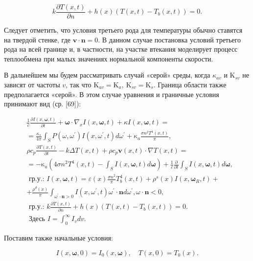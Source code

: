 \documentclass[10pt]{article}
\begin{document}
$$
k \frac{\partial T(x, t)}{\partial n}+h(x)\left(T(x, t)-T_{b}(x, t)\right)=0 .
$$

Следует отметить, что условия третьего рода для температуры обычно ставятся на твердой стенке, где $\mathbf{v} \cdot \mathbf{n}=0$. В данном случае постановка условий третьего рода на всей границе и, в частности, на участке втекания моделирует процесс теплообмена при малых значениях нормальной компоненты скорости.

В дальнейшем мы будем рассматривать случай «серой» среды, когда $\kappa_{a v}$ и $\mathrm{K}_{s v}$ не зависят от частоты $v$, так что $\mathrm{K}_{a v}=\mathrm{K}_{a}, \mathrm{~K}_{s v}=\mathrm{K}_{s}$. Граница области также предполагается «серой». В этом случае уравнения и граничные условия принимают вид (ср. [69]):

$$
\begin{aligned}
& \frac{1}{c} \frac{\partial I(x, \boldsymbol{\omega}, t)}{\partial t}+\boldsymbol{\omega} \cdot \nabla_{x} I(x, \boldsymbol{\omega}, t)+\kappa I(x, \boldsymbol{\omega}, t)= \\
& =\frac{\kappa_{s}}{4 \pi} \int_{S} P\left(\omega, \omega^{\prime}\right) I\left(x, \omega^{\prime}, t\right) d \omega^{\prime}+\kappa_{a} \frac{\sigma n^{2} T^{4}(x, t)}{\pi}, \\
& \rho c_{p} \frac{\partial T(x, t)}{\partial t}-k \Delta T(x, t)+\rho c_{p} \mathbf{v}(x, t) \cdot \nabla T(x, t)= \\
& =-\mathrm{\kappa}_{a}\left(4 \sigma n^{2} T^{4}(x, t)-\int_{S} I(x, \boldsymbol{\omega}, t) d \boldsymbol{\omega}\right)+\frac{1}{c} \frac{\partial}{\partial t} \int_{S} I(x, \boldsymbol{\omega}, t) d \boldsymbol{\omega}, \\
& \text { гр.у.: } I(x, \boldsymbol{\omega}, t)=\varepsilon(x) \frac{\sigma n^{2}}{\pi} T_{b}^{4}(x, t)+\rho^{s}(x) I\left(x, \boldsymbol{\omega}_{R}, t\right)+ \\
& +\frac{\rho^{d}(x)}{\pi} \int_{\omega^{\prime} \cdot \mathbf{n}>0} I\left(x, \omega^{\prime}, t\right) \omega^{\prime} \cdot \mathbf{n} d \omega^{\prime}, \omega \cdot \mathbf{n}<0, \\
& \text { гр.у.: } k \frac{\partial T(x, t)}{\partial n}+h(x)\left(T(x, t)-T_{b}(x, t)\right)=0 \text {. } \\
& \text { Здесь } I=\int_{0}^{\infty} I_{v} d v \text {. }
\end{aligned}
$$

Поставим также начальные условия:

$$
I(x, \boldsymbol{\omega}, 0)=I_{0}(x, \boldsymbol{\omega}), \quad T(x, 0)=T_{0}(x) .
$$
\end{document}
